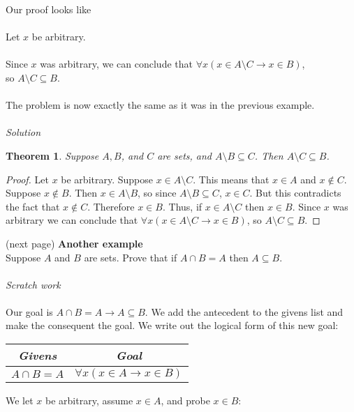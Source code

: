 \documentclass{report}
\newtheorem*{theorem}{Theorem}
\begin{document}
Our proof looks like\\
\vspace{1mm}\\
\indent Let $x$ be arbitrary.\\
\indent{}\\
\indent Since $x$ was arbitrary, we can conclude that $\forall x(x\in A\setminus C\to x\in B)$,\\
\indent so $A\setminus C\subseteq B$.\\
\vspace{1mm}\\
The problem is now exactly the same as it was in the previous example.\\
\vspace{1mm}\\
\textit{Solution}
\begin{theorem}
Suppose $A,B$, and $C$ are sets, and $A\setminus B\subseteq C$. Then $A\setminus C\subseteq B$.
\end{theorem}
\begin{proof}
Let $x$ be arbitrary. Suppose $x\in A\setminus C$. This means that $x\in A$ and $x\notin C$. Suppose $x\notin B$. Then $x\in A\setminus B$, so since $A\setminus B\subseteq C$, $x\in C$. But
this contradicts the fact that $x\notin C$. Therefore $x\in B$. Thus, if $x\in A\setminus C$ then $x\in B$. Since $x$ was arbitrary we can conclude that $\forall x(x\in A\setminus C\to x\in B)$, so
$A\setminus C\subseteq B$.
\end{proof}
\noindent(next page)\newpage
\noindent\textbf{Another example}\\
Suppose $A$ and $B$ are sets. Prove that if $A\cap B=A$ then $A\subseteq B$.\\
\vspace{1mm}\\
\textit{Scratch work}\\
\vspace{1mm}\\
Our goal is $A\cap B=A\to A\subseteq B$. We add the antecedent to the givens list and make the consequent the goal. We write out the logical form of this new goal:
\begin{center}
\begin{tabular}{c|c}
\textit{Givens}&\textit{Goal}\\
\hline
$A\cap B=A$&$\forall x(x\in A\to x\in B)$
\end{tabular}
\end{center}
We let $x$ be arbitrary, assume $x\in A$, and probe $x\in B$:
\end{document}
